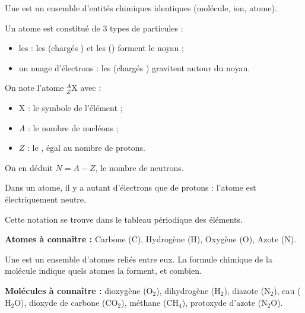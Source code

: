 \documentclass[11pt,a4paper]{article}
\begin{document}
\pagination


Une  est un ensemble d'entités chimiques identiques
(molécule, ion, atome).

\vspace*{-0.5em}


Un atome est constitué de 3 types de particules :
\begin{itemize}
    \item les  : les  (chargés
    ) et les  ()
    forment le noyau ;
    \item un nuage d'électrons : les  (chargés
    ) gravitent autour du noyau.
\end{itemize}

On note l'atome ${}^{A}_{Z}\mathrm{X}$ avec :
\begin{itemize}
    \item $\mathrm{X}$ : le symbole de l'élément ;
    \item $A$ : le nombre de nucléons ;
    \item $Z$ : le , égal au nombre de protons.
\end{itemize}

On en déduit $N = A - Z$, le nombre de neutrons.

Dans un atome, il y a autant d'électrons que de protons : l'atome est
électriquement neutre.

Cette notation se trouve dans le tableau périodique des éléments.

\textbf{Atomes à connaître :} Carbone (C), Hydrogène (H), Oxygène (O), Azote (N).

\vspace*{-0.5em}


Une  est un ensemble d'atomes reliés entre eux. La formule
chimique de la molécule indique quels atomes la forment, et combien.


\textbf{Molécules à connaître :} dioxygène ($\mathrm{O_2}$), dihydrogène
($\mathrm{H_2}$), diazote ($\mathrm{N_2}$), eau ($\mathrm{H_2O}$), dioxyde de
carbone ($\mathrm{CO_2}$), méthane ($\mathrm{CH_4}$), protoxyde d'azote
($\mathrm{N_2O}$).
\end{document}
